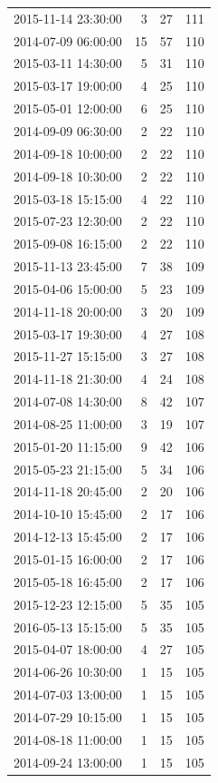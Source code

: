 \begin{tabular}{lrrr}
2015-11-14 23:30:00 & 3 & 27 & 111 \\
2014-07-09 06:00:00 & 15 & 57 & 110 \\
2015-03-11 14:30:00 & 5 & 31 & 110 \\
2015-03-17 19:00:00 & 4 & 25 & 110 \\
2015-05-01 12:00:00 & 6 & 25 & 110 \\
2014-09-09 06:30:00 & 2 & 22 & 110 \\
2014-09-18 10:00:00 & 2 & 22 & 110 \\
2014-09-18 10:30:00 & 2 & 22 & 110 \\
2015-03-18 15:15:00 & 4 & 22 & 110 \\
2015-07-23 12:30:00 & 2 & 22 & 110 \\
2015-09-08 16:15:00 & 2 & 22 & 110 \\
2015-11-13 23:45:00 & 7 & 38 & 109 \\
2015-04-06 15:00:00 & 5 & 23 & 109 \\
2014-11-18 20:00:00 & 3 & 20 & 109 \\
2015-03-17 19:30:00 & 4 & 27 & 108 \\
2015-11-27 15:15:00 & 3 & 27 & 108 \\
2014-11-18 21:30:00 & 4 & 24 & 108 \\
2014-07-08 14:30:00 & 8 & 42 & 107 \\
2014-08-25 11:00:00 & 3 & 19 & 107 \\
2015-01-20 11:15:00 & 9 & 42 & 106 \\
2015-05-23 21:15:00 & 5 & 34 & 106 \\
2014-11-18 20:45:00 & 2 & 20 & 106 \\
2014-10-10 15:45:00 & 2 & 17 & 106 \\
2014-12-13 15:45:00 & 2 & 17 & 106 \\
2015-01-15 16:00:00 & 2 & 17 & 106 \\
2015-05-18 16:45:00 & 2 & 17 & 106 \\
2015-12-23 12:15:00 & 5 & 35 & 105 \\
2016-05-13 15:15:00 & 5 & 35 & 105 \\
2015-04-07 18:00:00 & 4 & 27 & 105 \\
2014-06-26 10:30:00 & 1 & 15 & 105 \\
2014-07-03 13:00:00 & 1 & 15 & 105 \\
2014-07-29 10:15:00 & 1 & 15 & 105 \\
2014-08-18 11:00:00 & 1 & 15 & 105 \\
2014-09-24 13:00:00 & 1 & 15 & 105 \\

\end{tabular}
